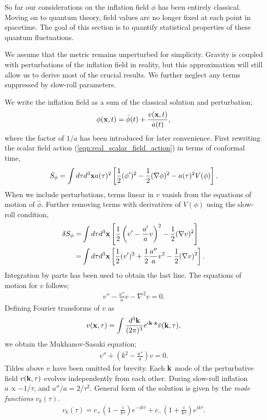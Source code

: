 So far our considerations on the inflation field $\phi$ has been entirely classical. Moving on to quantum theory, field values are no longer fixed at each point in spacetime. The goal of this section is to quantify statistical properties of these quantum fluctuations.

We assume that the metric remains unperturbed for simplicity. Gravity is coupled with perturbations of the inflation field in reality, but this approximation will still allow us to derive most of the crucial results. We further neglect any terms suppressed by slow-roll parameters.

We write the inflation field as a sum of the classical solution and perturbation;
\begin{align}
	\phi(\mathbf{x}, t) = \bar{\phi}(t) + \frac{v(\mathbf{x}, t)}{a(t)},	\label{eqn:inflation_perturbation_definition}
\end{align}
where the factor of $1/a$ has been introduced for later convenience. First rewriting the scalar field action (\ref{eqn:real_scalar_field_action}) in terms of conformal time,
\begin{align}
	S_\phi = \int d\tau d^3\mathbf{x} a(\tau)^2 \left[ \frac{1}{2} (\phi')^2 - \frac{1}{2}(\nabla\phi)^2 - a(\tau)^2 V(\phi) \right].
\end{align}
When we include perturbations, terms linear in $v$ vanish from the equations of motion of $\bar\phi$. Further removing terms with derivatives of $V(\phi)$ using the slow-roll condition,
\begin{align}
	\delta S_\phi =& \int d\tau d^3\mathbf{x} \left[ \frac{1}{2} \left(v' - \frac{a'}{a}v \right)^2 - \frac{1}{2}(\nabla v)^2 \right]	\\
	=& \int d\tau d^3\mathbf{x} \left[ \frac{1}{2} (v')^2 + \frac{1}{2}\frac{a''}{a} v^2 - \frac{1}{2}(\nabla v)^2 \right].
\end{align}
Integration by parts has been used to obtain the last line. The equations of motion for $v$ follows;
\begin{align}
	v'' - \frac{a''}{a} v - \nabla^2 v = 0.
\end{align}
Defining Fourier transforms of $v$ as
\begin{align}
	v(\mathbf{x},\tau) = \int \frac{d^3 \mathbf{k}}{(2\pi)^3} e^{i\mathbf{k} \cdot \mathbf{x}} \tilde{v}(\mathbf{k},\tau),
\end{align}
we obtain the Mukhanov-Sasaki equation;
\begin{align}
	v'' + (k^2 - \frac{a''}{a})v = 0.	\label{eqn:Mukhanov_Sasaki}
\end{align}
Tildes above $v$ have been omitted for brevity. Each $\mathbf{k}$ mode of the perturbative field $v(\mathbf{k},\tau)$ evolves independently from each other. During slow-roll inflation $a\propto-1/\tau$, and $a''/a = 2/\tau^2$. General form of the solution is given by the \textit{mode functions} $v_k(\tau)$.
\begin{align}
	v_k(\tau) = c_+ \left( 1 - \frac{i}{k\tau} \right) e^{-ik\tau} + c_- \left( 1 + \frac{i}{k\tau} \right) e^{ik\tau}.
\end{align}

